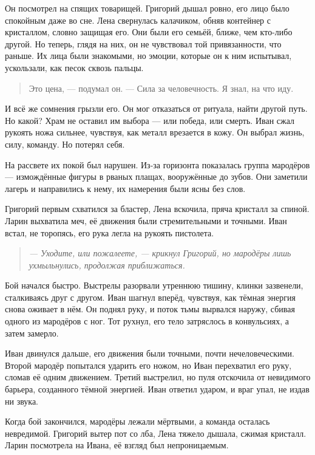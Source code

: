 \documentclass[12pt,a4paper]{book}
\newenvironment{dialogue}{\begin{quote}\itshape}{\end{quote}} %
\begin{document}
Он посмотрел на спящих товарищей. Григорий дышал ровно, его лицо было спокойным даже во сне. Лена свернулась калачиком, обняв контейнер с кристаллом, словно защищая его. Они были его семьёй, ближе, чем кто-либо другой. Но теперь, глядя на них, он не чувствовал той привязанности, что раньше. Их лица были знакомыми, но эмоции, которые он к ним испытывал, ускользали, как песок сквозь пальцы.

\begin{quote}
Это цена, --- подумал он. --- Сила за человечность. Я знал, на что иду.
\end{quote}

И всё же сомнения грызли его. Он мог отказаться от ритуала, найти другой путь. Но какой? Храм не оставил им выбора --- или победа, или смерть. Иван сжал рукоять ножа сильнее, чувствуя, как металл врезается в кожу. Он выбрал жизнь, силу, команду. Но потерял себя.

На рассвете их покой был нарушен. Из-за горизонта показалась группа мародёров --- измождённые фигуры в рваных плащах, вооружённые до зубов. Они заметили лагерь и направились к нему, их намерения были ясны без слов.

Григорий первым схватился за бластер, Лена вскочила, пряча кристалл за спиной. Ларин выхватила меч, её движения были стремительными и точными. Иван встал, не торопясь, его рука легла на рукоять пистолета.

\begin{dialogue}
--- Уходите, или пожалеете, --- крикнул Григорий, но мародёры лишь ухмыльнулись, продолжая приближаться.
\end{dialogue}

Бой начался быстро. Выстрелы разорвали утреннюю тишину, клинки зазвенели, сталкиваясь друг с другом. Иван шагнул вперёд, чувствуя, как тёмная энергия снова оживает в нём. Он поднял руку, и поток тьмы вырвался наружу, сбивая одного из мародёров с ног. Тот рухнул, его тело затряслось в конвульсиях, а затем замерло.

Иван двинулся дальше, его движения были точными, почти нечеловеческими. Второй мародёр попытался ударить его ножом, но Иван перехватил его руку, сломав её одним движением. Третий выстрелил, но пуля отскочила от невидимого барьера, созданного тёмной энергией. Иван ответил ударом, и враг упал, не издав ни звука.

Когда бой закончился, мародёры лежали мёртвыми, а команда осталась невредимой. Григорий вытер пот со лба, Лена тяжело дышала, сжимая кристалл. Ларин посмотрела на Ивана, её взгляд был непроницаемым.
\end{document}
